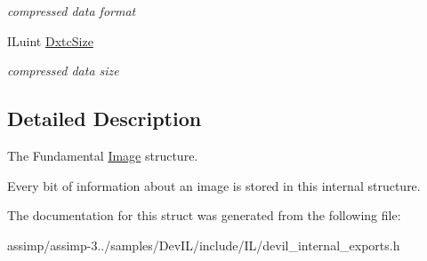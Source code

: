 \begin{DoxyCompactItemize}
\begin{DoxyCompactList}\small\item\em compressed data format \end{DoxyCompactList}\item 
\hypertarget{struct_i_limage_a5d423e11ee4e5076d92f6a7e863b2070}{I\+Luint \hyperlink{struct_i_limage_a5d423e11ee4e5076d92f6a7e863b2070}{Dxtc\+Size}}\label{struct_i_limage_a5d423e11ee4e5076d92f6a7e863b2070}

\begin{DoxyCompactList}\small\item\em compressed data size \end{DoxyCompactList}\end{DoxyCompactItemize}


\subsection{Detailed Description}
The Fundamental \hyperlink{class_image}{Image} structure. 

Every bit of information about an image is stored in this internal structure. 

The documentation for this struct was generated from the following file\+:\begin{DoxyCompactItemize}
\item 
assimp/assimp-\/3../samples/\+Dev\+I\+L/include/\+I\+L/devil\+\_\+internal\+\_\+exports.\+h\end{DoxyCompactItemize}
